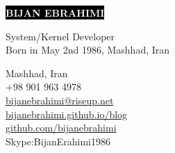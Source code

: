 \documentclass[12pt]{developercv}
\begin{document}
\begin{minipage}[t]{0.65\textwidth} %
	\vspace{-\baselineskip} %
	
	\colorbox{black}{{\HUGE\textcolor{white}{\textbf{\MakeUppercase{Bijan Ebrahimi}}}}} %
	
	\vspace{6pt}
	
	{\huge System/Kernel Developer}\\ %
	{Born in May 2nd 1986, Mashhad, Iran}
\end{minipage}
\begin{minipage}[t]{0.35\textwidth} %
	\vspace{-\baselineskip} %
	
	{Mashhad, Iran}\\
	{+98 901 963 4978}\\
	{\href{mailto:bijanebrahimi@riseup.net}{bijanebrahimi@riseup.net}}\\	
	{\href{https://bijanebrahimi.github.io/blog}{bijanebrahimi.github.io/blog}}\\
	{\href{https://github.com/bijanebrahimi}{github.com/bijanebrahimi}}\\
	{{Skype:BijanErahimi1986}}
\end{minipage}

\vspace{0.5cm}


\end{document}
